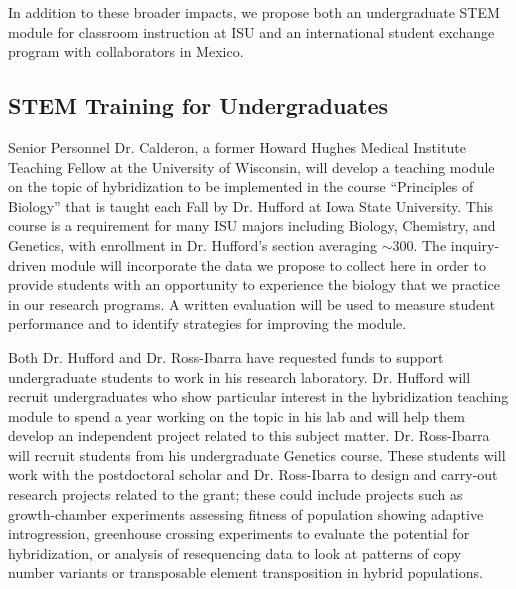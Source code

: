 In addition to these broader impacts, we propose both an undergraduate STEM module for classroom instruction at ISU and an international student exchange program with collaborators in Mexico.

\subsection*{STEM Training for Undergraduates}
Senior Personnel Dr. Calderon, a former Howard Hughes Medical Institute Teaching Fellow at the University of Wisconsin, will develop a teaching module on the topic of hybridization to be implemented in the course ``Principles of Biology'' that is taught each Fall by Dr. Hufford at Iowa State University.
This course is a requirement for many ISU majors including Biology, Chemistry, and Genetics, with enrollment in Dr. Hufford's section averaging $\sim$300.
The inquiry-driven module will incorporate the data we propose to collect here in order to provide students with an opportunity to experience the biology that we practice in our research programs.
A written evaluation will be used to measure student performance and to identify strategies for improving the module.

Both Dr. Hufford and Dr. Ross-Ibarra have requested funds to support undergraduate students to work in his research laboratory.
Dr. Hufford will recruit undergraduates who show particular interest in the hybridization teaching module to spend a year working on the topic in his lab and will help them develop an independent project related to this subject matter.
Dr. Ross-Ibarra will recruit students from his undergraduate Genetics course.  These students will work with the postdoctoral scholar and Dr. Ross-Ibarra to design and carry-out research projects related to the grant; these could include projects such as growth-chamber experiments assessing fitness of population showing adaptive introgression, greenhouse crossing experiments to evaluate the potential for hybridization, or analysis of resequencing data to look at patterns of copy number variants or transposable element transposition in hybrid populations.

